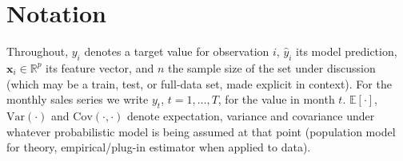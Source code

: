 \section{Notation}
Throughout, $y_i$ denotes a target value for observation $i$,
$\hat y_i$ its model prediction, $\mathbf{x}_i \in \mathbb{R}^p$ its feature
vector, and $n$ the sample size of the set under discussion (which may be a
train, test, or full-data set, made explicit in context). For the monthly
sales series we write $y_t$, $t = 1, \dots, T$, for the value in month $t$.
$\mathbb{E}[\cdot]$, $\mathrm{Var}(\cdot)$ and $\mathrm{Cov}(\cdot,\cdot)$
denote expectation, variance and covariance under whatever probabilistic
model is being assumed at that point (population model for theory,
empirical/plug-in estimator when applied to data).
